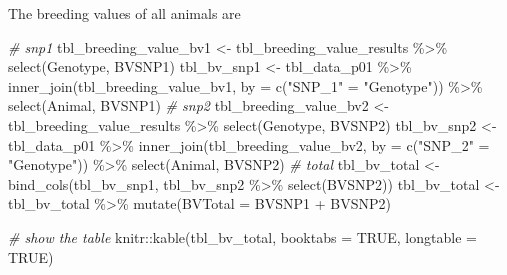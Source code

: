 \documentclass[
]{article}
\newenvironment{Shaded}{\begin{snugshade}}{\end{snugshade}}
\newcommand{\AttributeTok}[1]{\textcolor[rgb]{0.77,0.63,0.00}{#1}}
\newcommand{\CommentTok}[1]{\textcolor[rgb]{0.56,0.35,0.01}{\textit{#1}}}
\newcommand{\ConstantTok}[1]{\textcolor[rgb]{0.00,0.00,0.00}{#1}}
\newcommand{\FunctionTok}[1]{\textcolor[rgb]{0.00,0.00,0.00}{#1}}
\newcommand{\NormalTok}[1]{#1}
\newcommand{\OtherTok}[1]{\textcolor[rgb]{0.56,0.35,0.01}{#1}}
\newcommand{\SpecialCharTok}[1]{\textcolor[rgb]{0.00,0.00,0.00}{#1}}
\newcommand{\StringTok}[1]{\textcolor[rgb]{0.31,0.60,0.02}{#1}}
\begin{document}
The breeding values of all animals are

\begin{Shaded}
\begin{Highlighting}[]
\CommentTok{\# snp1}
\NormalTok{tbl\_breeding\_value\_bv1 }\OtherTok{\textless{}{-}}\NormalTok{ tbl\_breeding\_value\_results }\SpecialCharTok{\%\textgreater{}\%} \FunctionTok{select}\NormalTok{(Genotype, BVSNP1)}
\NormalTok{tbl\_bv\_snp1 }\OtherTok{\textless{}{-}}\NormalTok{ tbl\_data\_p01 }\SpecialCharTok{\%\textgreater{}\%} 
  \FunctionTok{inner\_join}\NormalTok{(tbl\_breeding\_value\_bv1, }\AttributeTok{by =} \FunctionTok{c}\NormalTok{(}\StringTok{"SNP\_1"} \OtherTok{=} \StringTok{"Genotype"}\NormalTok{)) }\SpecialCharTok{\%\textgreater{}\%}
  \FunctionTok{select}\NormalTok{(Animal, BVSNP1)}
\CommentTok{\# snp2}
\NormalTok{tbl\_breeding\_value\_bv2 }\OtherTok{\textless{}{-}}\NormalTok{ tbl\_breeding\_value\_results }\SpecialCharTok{\%\textgreater{}\%} \FunctionTok{select}\NormalTok{(Genotype, BVSNP2)}
\NormalTok{tbl\_bv\_snp2 }\OtherTok{\textless{}{-}}\NormalTok{ tbl\_data\_p01 }\SpecialCharTok{\%\textgreater{}\%} 
  \FunctionTok{inner\_join}\NormalTok{(tbl\_breeding\_value\_bv2, }\AttributeTok{by =} \FunctionTok{c}\NormalTok{(}\StringTok{"SNP\_2"} \OtherTok{=} \StringTok{"Genotype"}\NormalTok{)) }\SpecialCharTok{\%\textgreater{}\%}
  \FunctionTok{select}\NormalTok{(Animal, BVSNP2)}
\CommentTok{\# total}
\NormalTok{tbl\_bv\_total }\OtherTok{\textless{}{-}} \FunctionTok{bind\_cols}\NormalTok{(tbl\_bv\_snp1, tbl\_bv\_snp2 }\SpecialCharTok{\%\textgreater{}\%} \FunctionTok{select}\NormalTok{(BVSNP2))}
\NormalTok{tbl\_bv\_total }\OtherTok{\textless{}{-}}\NormalTok{ tbl\_bv\_total }\SpecialCharTok{\%\textgreater{}\%}
  \FunctionTok{mutate}\NormalTok{(}\AttributeTok{BVTotal =}\NormalTok{ BVSNP1 }\SpecialCharTok{+}\NormalTok{ BVSNP2)}

\CommentTok{\# show the table}
\NormalTok{knitr}\SpecialCharTok{::}\FunctionTok{kable}\NormalTok{(tbl\_bv\_total, }\AttributeTok{booktabs =} \ConstantTok{TRUE}\NormalTok{, }\AttributeTok{longtable =} \ConstantTok{TRUE}\NormalTok{)}
\end{Highlighting}
\end{Shaded}
\end{document}
